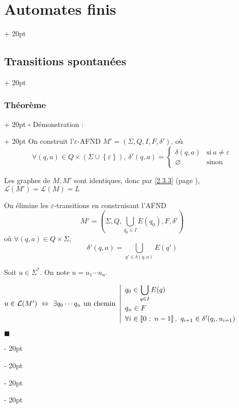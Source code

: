 \documentclass[a4paper, 12pt, twoside]{article}
\newcommand{\nset}[2]{\left\llbracket #1\ ;\ #2 \right\rrbracket}
\newcommand{\lr}[1]{\left( #1 \right)}
\newcommand{\set}[1]{\left\{ #1 \right\}}
\newcommand{\ssi}{\ \Leftrightarrow \ }
\newcommand{\ind}[1][20pt]{\advance\leftskip + #1}
\newcommand{\deind}[1][20pt]{\advance\leftskip - #1}
\newenvironment{indt}[2][20pt]{#2 \par \ind[#1]}{\par \deind} %
\newenvironment{proof}[1][{Démonstration :}]{\begin{indt}{$\square$ #1}}{$\blacksquare$ \end{indt}}
\begin{document}
\begin{indt}{\section{Automates finis}}
\begin{indt}{\subsection{Transitions spontanées}}
\begin{indt}{\subsubsection{Théorème}}
\begin{proof}
                    On construit l'$\varepsilon$-AFND $M' = (\Sigma, Q, I, F, \delta')$, où
                    \[
                        \forall (q, a) \in Q \times (\Sigma \cup \set \varepsilon),\
                        \delta'(q, a) =
                        \begin{cases}
                            \delta(q, a)
                            & \text{si}\ a \neq \varepsilon
                            \\
                            \varnothing
                            & \text{sinon}
                        \end{cases}
                    \]

                    Les graphes de $M, M'$ sont identiques, donc par \ref{2.3.3} (page \pageref{2.3.3}), $\mathcal L(M') = \mathcal L(M) = L$

                    \vspace{12pt}
                    
                    \boxed{\Leftarrow} On élimine les $\varepsilon$-transitions en construisant l'AFND
                    \[
                        M' = \lr{\Sigma, Q, \bigcup_{q_0 \in I} E(q_0), F, \delta'}
                    \]
                    où $\forall (q, a) \in Q \times \Sigma$,
                    \[
                        \delta'(q, a) = \bigcup_{q' \in \delta(q, a)} E(q')
                    \]

                    Soit $u \in \Sigma^*$. On note $u = u_1 \cdots u_n$.

                    $
                        u \in \mathcal L(M')
                        \ssi \exists q_0 \cdots q_n\ \text{un chemin}\
                        \left|
                        \begin{array}{l}
                            \displaystyle
                            q_0 \in \bigcup_{q \in I} E(q)
                            \vspace{3pt}
                            \\
                            q_n \in F
                            \vspace{3pt}
                            \\
                            \forall i \in \nset 0 {n - 1},\ q_{i+1} \in \delta'(q_i, u_{i + 1})
                        \end{array}
                        \right.
                    $


\end{proof}
\end{indt}
\end{indt}
\end{indt}
\end{document}
